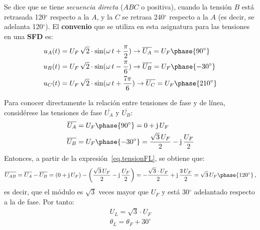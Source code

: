	Se dice que se tiene \textit{secuencia directa} ($ABC$ o positiva), cuando la tensión $B$ está retrasada 120$^\circ$ respecto a la $A$, y la $C$ se retrasa 240$^\circ$ respecto a la $A$ (es decir, se adelanta 120$^\circ$). El \textbf{convenio} que se utiliza en esta asignatura para las tensiones en una \textbf{SFD} es:
	\begin{align*}
		u_A(t)&=U_F\,\sqrt{2}\cdot \sin(\omega\, t+\frac{\pi}{2}) \rightarrow \overline{U_A}=U_F\phase {90^\circ}\\
		u_B(t)&=U_F\,\sqrt{2}\cdot \sin(\omega\, t-\frac{\pi}{6})\rightarrow \overline{U_B}=U_F\phase {-30^\circ}\\
		u_C(t)&=U_F\,\sqrt{2}\cdot \sin(\omega\,t+\frac{7\pi}{6}) \rightarrow \overline{U_C}=U_F\phase {210^\circ}
	\end{align*}
	
	Para conocer directamente la relación entre tensiones de fase y de línea, considérese las tensiones de fase $\overline{U_A}$ y $\overline{U_B}$: 
	\begin{align*}
		\overline{U_A} &= U_F\phase{90^\circ}=0+\mathrm{j}\,U_F
		\\
		\overline{U_B} &= U_F\phase{-30^\circ}=\dfrac{\sqrt{3}\,U_F}{2}-\mathrm{j}\,\dfrac{U_F}{2}
	\end{align*}
	Entonces, a partir de la expresión~\eqref{eq.tensionFL}, se obtiene que:
	\begin{equation*}
		\overline{U_{AB}}=\overline{U_{A}}-\overline{U_{B}}=(0+\mathrm{j}\,U_F)-\left(\dfrac{\sqrt{3}\,U_F}{2}-\mathrm{j}\,\dfrac{U_F}{2}\right)=-\dfrac{\sqrt{3}\cdot U_F}{2}+\mathrm{j}\,\dfrac{3\,U_F}{2}=\sqrt{3}\,U_F \phase{ 120^\circ}\,,
	\end{equation*}
	es decir, que el módulo es $\sqrt{3}$ veces mayor que $U_F$ y está 30$^\circ$ adelantado respecto a la de fase. Por tanto:  
	\begin{equation}\label{eq.sfd_fase-linea}
		\boxed{
			\begin{array}{l}
				U_L = \sqrt{3}\cdot U_F\\
				\theta_L = \theta_F + 30^\circ\\
			\end{array}
		} 
	\end{equation}
	
